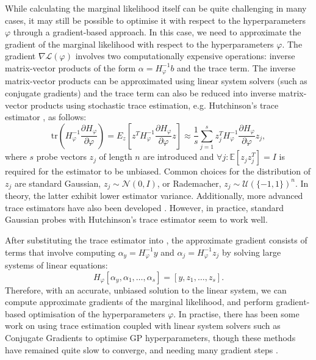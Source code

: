 While calculating the marginal likelihood itself can be quite challenging in many cases, it may still be possible to optimise it with respect to the hyperparameters $\varphi$ through a gradient-based approach. In this case, we need to approximate the gradient of the marginal likelihood with respect to the hyperparameters $\varphi$. The gradient $\nabla \mathcal{L}(\varphi)$ involves two computationally expensive operations: inverse matrix-vector products of the form $\alpha = H_{\varphi}^{-1} b$ and the trace term. The inverse matrix-vector products can be approximated using linear system solvers (such as conjugate gradients) and the trace term can also be reduced into inverse matrix-vector products using stochastic trace estimation, e.g. Hutchinson's trace estimator \cite{hutchinson1989stochastic, skilling1989eigenvalues}, as follows:
\[
    \text{tr}\left(H_{\varphi}^{-1} \frac{\partial H_{\varphi}}{\partial \varphi}\right) = \mathbb{}E_{z} \left[ z^T H_{\varphi}^{-1} \frac{\partial H_{\varphi}}{\partial \varphi} z \right] \approx \frac{1}{s} \sum_{j=1}^s z_j^T H_{\varphi}^{-1} \frac{\partial H_{\varphi}}{\partial \varphi} z_j,
\]
where $s$ probe vectors $z_j$ of length $n$ are introduced and $\forall j : \mathbb{E}[z_j z_j^T] = I$ is required for the estimator to be unbiased. Common choices for the distribution of $z_j$ are standard Gaussian, $z_j \sim \mathcal{N}(0, I)$, or Rademacher, $z_j \sim \mathcal{U}(\{-1, 1\})^n$. In theory, the latter exhibit lower estimator variance. Additionally, more advanced trace estimators have also been developed \citep{Hutch++, XTrace}. However, in practice, standard Gaussian probes with Hutchinson's trace estimator seem to work well.

After substituting the trace estimator into , the approximate gradient consists of terms that involve computing $\alpha_y = H_{\varphi}^{-1} y$ and $\alpha_{j} = H_{\varphi}^{-1} z_j$ by solving large systems of linear equations:
\[
H_{\varphi}\left[ \alpha_y, \alpha_1, \ldots, \alpha_s \right] = \left[ y, z_1, \ldots, z_s \right]. \label{eq:linear_system_trace_estimation}
\]
Therefore, with an accurate, unbiased solution to the linear system, we can compute approximate gradients of the marginal likelihood, and perform gradient-based optimisation of the hyperparameters $\varphi$. In practise, there has been some work on using trace estimation coupled with linear system solvers such as Conjugate Gradients to optimise GP hyperparameters, though these methods have remained quite slow to converge, and needing many gradient steps \citep{gardner18, wu2024largescale}.

